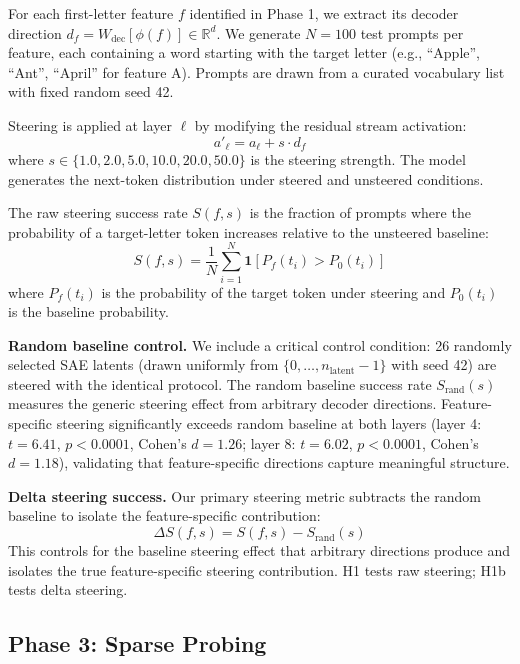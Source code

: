\documentclass{article}
\begin{document}
For each first-letter feature $f$ identified in Phase 1, we extract its decoder direction $d_f = W_{\text{dec}}[\phi(f)] \in \mathbb{R}^d$. We generate $N = 100$ test prompts per feature, each containing a word starting with the target letter (e.g., ``Apple'', ``Ant'', ``April'' for feature A). Prompts are drawn from a curated vocabulary list with fixed random seed 42.

Steering is applied at layer $\ell$ by modifying the residual stream activation:
\begin{equation}
a'_\ell = a_\ell + s \cdot d_f
\end{equation}
where $s \in \{1.0, 2.0, 5.0, 10.0, 20.0, 50.0\}$ is the steering strength. The model generates the next-token distribution under steered and unsteered conditions.

The raw steering success rate $S(f, s)$ is the fraction of prompts where the probability of a target-letter token increases relative to the unsteered baseline:
\begin{equation}
S(f, s) = \frac{1}{N} \sum_{i=1}^{N} \mathbf{1}\left[ P_f(t_i) > P_0(t_i) \right]
\end{equation}
where $P_f(t_i)$ is the probability of the target token under steering and $P_0(t_i)$ is the baseline probability.

\textbf{Random baseline control.} We include a critical control condition: 26 randomly selected SAE latents (drawn uniformly from $\{0, \ldots, n_{\text{latent}}-1\}$ with seed 42) are steered with the identical protocol. The random baseline success rate $S_{\text{rand}}(s)$ measures the generic steering effect from arbitrary decoder directions. Feature-specific steering significantly exceeds random baseline at both layers (layer 4: $t = 6.41$, $p < 0.0001$, Cohen's $d = 1.26$; layer 8: $t = 6.02$, $p < 0.0001$, Cohen's $d = 1.18$), validating that feature-specific directions capture meaningful structure.

\textbf{Delta steering success.} Our primary steering metric subtracts the random baseline to isolate the feature-specific contribution:
\begin{equation}
\Delta S(f, s) = S(f, s) - S_{\text{rand}}(s)
\end{equation}
This controls for the baseline steering effect that arbitrary directions produce and isolates the true feature-specific steering contribution. H1 tests raw steering; H1b tests delta steering.

\subsection{Phase 3: Sparse Probing}
\end{document}
